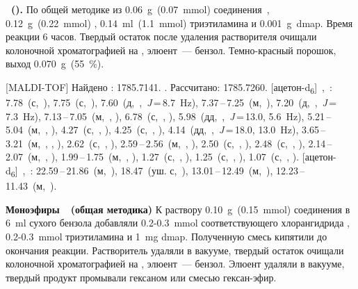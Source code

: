 \textbf{~().}
По общей методике из \SI{0.06}{\gram}~(\SI{0.07}{\milli\mole}) соединения~, \SI{0.12}{\gram}~(\SI{0.22}{\milli\mole}) , \SI{0.14}{\milli\litre}~(\SI{1.1}{\milli\mole}) триэтиламина и \SI{0.001}{\gram}~\ac{dmap}.
Время реакции 6 часов. Твердый остаток после удаления растворителя очищали колоночной хроматографией на , элюент~--- бензол.
Темно-красный порошок, выход \SI{0.070}{\gram}~(\SI{55}{\percent}). 
\begin{experimental}
    [MALDI-TOF] Найдено \ce{[M + H]+}: \num{1785.7141}. . Рассчитано: \ce{[M + H]} \num{1785.7260}.
    [ацетон-d\textsubscript{6}]~\chemdelta,~\si{\ppm}: 7.78~(с,~), 7.75~(с,~), 7.60~(д,~,~\textit{J}\,=\,8.7~\si{\hertz}), 7.37\,--\,7.25~(м,~), 7.20~(д,~,~\textit{J}\,=\,7.3~\si{\hertz}), 7.13\,--\,7.05~(м,~, ), 6.78~(с,~, ), 5.98~(дд,~,~\textit{J}\,=\,13.0, 5.6~\si{\hertz}), 5.21\,--\,5.04~(м,~, ), 4.27~(с,~, ), 4.25~(с,~, ), 4.14~(дд,~,~\textit{J}\,=\,18.0, 13.0~\si{\hertz}), 3.65\,--\,3.21~(м,~, , ), 2.62~(с,~, ), 2.59\,--\,2.56~(м,~, ), 2.50~(с,~, ), 2.48~(с,~, ), 2.14\,--\,2.07~(м,~, ), 1.99\,--\,1.75~(м,~, ), 1.27~(с,~, ), 1.25~(с,~, ), 1.07~(с,~, ).
    [ацетон-d\textsubscript{6}]~\chemdelta,~\si{\ppm}: 22.59\,--\,21.86~(м,~), 18.47~(уш. с,~), 13.01\,--\,12.49~(м,~), 12.23\,--\,11.43~(м,~).
\end{experimental}

\textbf{Моноэфиры~~(общая методика)}
К раствору \SI{0.10}{\gram}~(\SI{0.15}{\milli\mole}) соединения  в \SI{6}{\milli\litre} сухого бензола добавляли 0.2-0.3~\si{\milli\mole} соответствующего хлорангидрида , 0.2-0.3~\si{\milli\mole} триэтиламина и \SI{1}{\milli\gram} \ac{dmap}.
Полученную смесь кипятили до окончания реакции.
Растворитель удаляли в вакууме, твердый остаток очищали колоночной хроматографией на , элюент~--- бензол.
Элюент удаляли в вакууме, твердый продукт промывали гексаном или смесью гексан-эфир.

